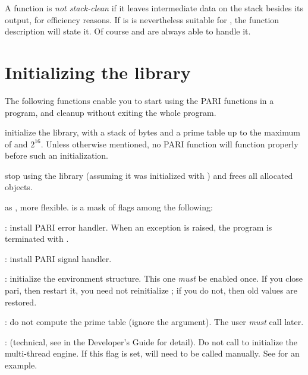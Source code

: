 A function is \emph{not stack-clean} if it leaves intermediate data on the
stack besides its output, for efficiency reasons. If is is nevertheless
suitable for , the function description will state it. Of course
 and  are always able to handle it.

\section{Initializing the library}

The following functions enable you to start using the PARI functions
in a program, and cleanup without exiting the whole program.


 initialize the
library, with a stack of  bytes and a prime table
up to the maximum of  and $2^{16}$. Unless otherwise
mentioned, no PARI function will function properly before such an
initialization.

 stop using the library (assuming it was
initialized with ) and frees all allocated objects.

\label{se:pari_init_tech}

 as
, more flexible.  is a mask of flags
among the following:

  : install PARI error handler. When an exception is
raised, the program is terminated with .

  : install PARI signal handler.

  : initialize the  environment structure.
This one \emph{must} be enabled once. If you close pari, then restart it,
you need not reinitialize ; if you do not, then old values are
restored.

  : do not compute the prime table (ignore the
   argument). The user \emph{must} call
   later.

  : (technical, see  in the Developer's
Guide for detail). Do not call  to initialize the
multi-thread engine. If this flag is set,  will need to
be called manually. See  for an example.

